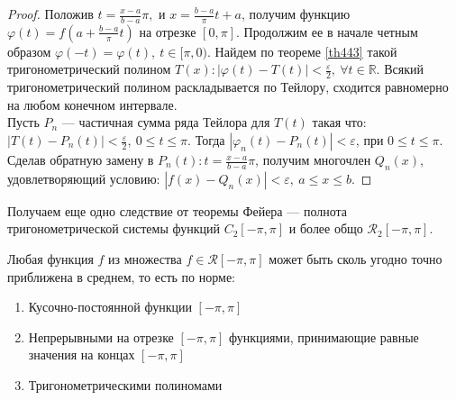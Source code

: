 \begin{proof}
  Положив $t = \frac{x - a}{b - a} \pi,$ и $x = \frac{b - a}{\pi}t + a$, получим
  функцию $\varphi(t) = f(a + \frac{b - a}{\pi}t)$ на отрезке $[0, \pi]$.
  Продолжим ее в начале четным образом $\varphi(-t) = \varphi(t), \ t \in [\pi,
  0)$. Найдем по теореме \eqref{th443} такой тригонометрический полином
  $T(x): |\varphi(t) - T(t)| < \frac{\varepsilon}{2}, \ \forall t \in
  \mathbb{R}$. Всякий тригонометрический полином раскладывается по Тейлору,
  сходится равномерно на любом конечном интервале. \\
  Пусть $P_n$ --- частичная сумма ряда Тейлора для $T(t)$ такая что: $|T(t) -
  P_n(t)| < \frac{\varepsilon}{2}, \ 0 \leq t \leq \pi$. Тогда $|\varphi_n(t) -
  P_n(t)| < \varepsilon$, при $0 \leq t \leq \pi$. Сделав обратную замену в
  $P_n(t): t = \frac{x - a}{b - a} \pi$, получим многочлен $Q_n(x)$,
  удовлетворяющий условию: $|f(x) - Q_n(x)| < \varepsilon, \ a \leq x \leq b$.
\end{proof}

Получаем еще одно следствие от теоремы Фейера --- полнота тригонометрической
системы функций $C_2[-\pi, \pi]$ и более общо $\mathcal{R}_2[-\pi, \pi]$.

\begin{theorem}
  \label{th445}
  Любая функция $f$ из множества $f \in \mathcal{R}[-\pi, \pi]$ может быть сколь угодно
  точно приближена в среднем, то есть по норме:
  \begin{enumerate}
    \item Кусочно-постоянной функции $[-\pi, \pi]$
    \item Непрерывными на отрезке $[-\pi, \pi]$ функциями, принимающие равные
      значения на концах $[-\pi, \pi]$
    \item Тригонометрическими полиномами
  \end{enumerate}
\end{theorem}

